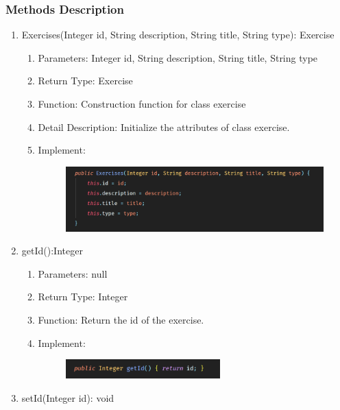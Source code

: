 \documentclass[16pt]{scrreprt}
\begin{document}
\subsubsection{Methods Description}
\begin{enumerate}
    \item Exercises(Integer id, String description, String title, String type): Exercise
    \begin{enumerate}
        \item Parameters: Integer id, String description, String title, String type
        \item Return Type: Exercise
        \item Function: Construction function for class exercise
        \item Detail Description: Initialize the attributes of class exercise.
        \item Implement:
        \begin{figure}[H]
    \centering
    \includegraphics[width=1.\textwidth]{diagrams/exercisefunc.png}\\
\end{figure}
    \end{enumerate}
    \item getId():Integer 
    \begin{enumerate}
        \item Parameters: null
        \item Return Type: Integer
        \item Function: Return the id of the exercise.
        \item Implement:
        \begin{figure}[H]
    \centering
    \includegraphics[width=0.6\textwidth]{diagrams/ex-getid.png}\\
\end{figure}
    \end{enumerate}
    \item setId(Integer id): void
    \begin{enumerate}

\end{enumerate}
\end{enumerate}
\end{document}
